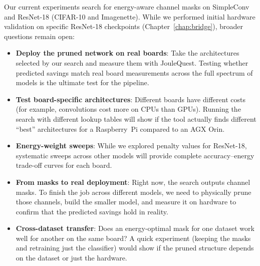 Our current experiments search for energy-aware channel masks on SimpleConv and ResNet-18 (CIFAR-10 and Imagenette). While we performed initial hardware validation on specific ResNet-18 checkpoints (Chapter~\ref{chap:bridge}), broader questions remain open:

\begin{itemize}
    \item \textbf{Deploy the pruned network on real boards}: Take the architectures selected by our search and measure them with JouleQuest. Testing whether predicted savings match real board measurements across the full spectrum of models is the ultimate test for the pipeline.
    \item \textbf{Test board-specific architectures}: Different boards have different costs (for example, convolutions cost more on CPUs than GPUs). Running the search with different lookup tables will show if the tool actually finds different ``best'' architectures for a Raspberry~Pi compared to an AGX Orin.
    \item \textbf{Energy-weight sweeps}: While we explored penalty values for ResNet-18, systematic sweeps across other models will provide complete accuracy--energy trade-off curves for each board.
    \item \textbf{From masks to real deployment}: Right now, the search outputs channel masks. To finish the job across different models, we need to physically prune those channels, build the smaller model, and measure it on hardware to confirm that the predicted savings hold in reality.
    \item \textbf{Cross-dataset transfer}: Does an energy-optimal mask for one dataset work well for another on the same board? A quick experiment (keeping the masks and retraining just the classifier) would show if the pruned structure depends on the dataset or just the hardware.
\end{itemize}
